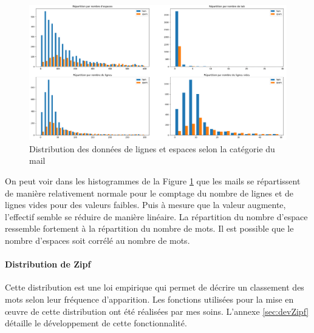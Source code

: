 \documentclass[a4paper,12pt]{article}
\begin{document}
			\begin{figure}[H]
				\includegraphics[width=\linewidth]{img/p2lignes.png}
				\caption{Distribution des données de lignes et espaces selon la catégorie du mail}
				\label{fig:p2lignes}
			\end{figure}	
		
		On peut voir dans les histogrammes de la Figure \ref{fig:p2lignes} que les mails se répartissent de manière relativement normale pour le comptage du nombre de lignes et de lignes vides pour des valeurs faibles. Puis à mesure que la valeur augmente, l'effectif semble se réduire de manière linéaire. La répartition du nombre d'espace ressemble fortement à la répartition du nombre de mots. Il est possible que le nombre d'espaces soit corrélé au nombre de mots.  
		
		\paragraph{Distribution de Zipf} Cette distribution est une loi empirique qui permet de décrire un classement des mots selon leur fréquence d'apparition. Les fonctions utilisées pour la mise en œuvre de cette distribution ont été réalisées par mes soins. L'annexe \ref{sec:devZipf} détaille le développement de cette fonctionnalité.  
		
\end{document}
